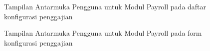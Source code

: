 \begin{figure}[H]
\centering
{}
\caption{Tampilan Antarmuka Pengguna untuk Modul Payroll pada daftar konfigurasi penggajian}
\label{fig:payroll_configuration_list}
\end{figure}

\begin{figure}[H]
\centering
{}
\caption{Tampilan Antarmuka Pengguna untuk Modul Payroll pada form konfigurasi penggajian}
\label{fig:payroll_configuration_form}
\end{figure}

